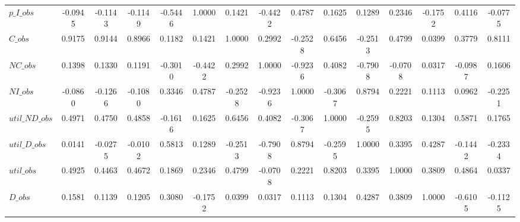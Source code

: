 \begin{center}
\begin{longtable}{lcccccccccccccc}
$p\_I\_obs      $	 & 	          -0.0945	 & 	          -0.1143	 & 	          -0.1149	 & 	          -0.5446	 & 	           1.0000	 & 	           0.1421	 & 	          -0.4422	 & 	           0.4787	 & 	           0.1625	 & 	           0.1289	 & 	           0.2346	 & 	          -0.1752	 & 	           0.4116	 & 	          -0.0775 \\ 
$C\_obs         $	 & 	           0.9175	 & 	           0.9144	 & 	           0.8966	 & 	           0.1182	 & 	           0.1421	 & 	           1.0000	 & 	           0.2992	 & 	          -0.2528	 & 	           0.6456	 & 	          -0.2513	 & 	           0.4799	 & 	           0.0399	 & 	           0.3779	 & 	           0.8111 \\ 
$NC\_obs        $	 & 	           0.1398	 & 	           0.1330	 & 	           0.1191	 & 	          -0.3010	 & 	          -0.4422	 & 	           0.2992	 & 	           1.0000	 & 	          -0.9236	 & 	           0.4082	 & 	          -0.7908	 & 	          -0.0708	 & 	           0.0317	 & 	          -0.0987	 & 	           0.1606 \\ 
$NI\_obs        $	 & 	          -0.0860	 & 	          -0.1266	 & 	          -0.1080	 & 	           0.3346	 & 	           0.4787	 & 	          -0.2528	 & 	          -0.9236	 & 	           1.0000	 & 	          -0.3067	 & 	           0.8794	 & 	           0.2221	 & 	           0.1113	 & 	           0.0962	 & 	          -0.2251 \\ 
$util\_ND\_obs  $	 & 	           0.4971	 & 	           0.4750	 & 	           0.4858	 & 	          -0.1616	 & 	           0.1625	 & 	           0.6456	 & 	           0.4082	 & 	          -0.3067	 & 	           1.0000	 & 	          -0.2595	 & 	           0.8203	 & 	           0.1304	 & 	           0.5871	 & 	           0.1765 \\ 
$util\_D\_obs   $	 & 	           0.0141	 & 	          -0.0275	 & 	          -0.0102	 & 	           0.5813	 & 	           0.1289	 & 	          -0.2513	 & 	          -0.7908	 & 	           0.8794	 & 	          -0.2595	 & 	           1.0000	 & 	           0.3395	 & 	           0.4287	 & 	          -0.1442	 & 	          -0.2334 \\ 
$util\_obs      $	 & 	           0.4925	 & 	           0.4463	 & 	           0.4672	 & 	           0.1869	 & 	           0.2346	 & 	           0.4799	 & 	          -0.0708	 & 	           0.2221	 & 	           0.8203	 & 	           0.3395	 & 	           1.0000	 & 	           0.3809	 & 	           0.4864	 & 	           0.0337 \\ 
$D\_obs         $	 & 	           0.1581	 & 	           0.1139	 & 	           0.1205	 & 	           0.3080	 & 	          -0.1752	 & 	           0.0399	 & 	           0.0317	 & 	           0.1113	 & 	           0.1304	 & 	           0.4287	 & 	           0.3809	 & 	           1.0000	 & 	          -0.6105	 & 	          -0.1125 \\ 

\end{longtable}
\end{center}
